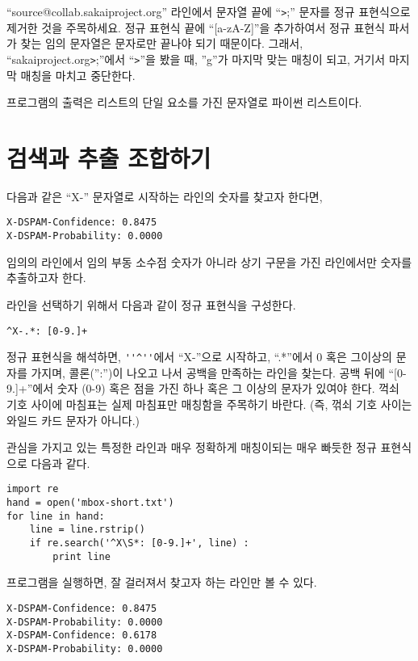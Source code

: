 ``source@collab.sakaiproject.org'' 라인에서 문자열 끝에 ``\verb">";'' 문자를 정규 표현식으로 제거한 것을 주목하세요.
정규 표현식 끝에 ``[a-zA-Z]''을 추가하여서 정규 표현식 파서가 찾는 임의 문자열은 문자로만 끝나야 되기 때문이다.
그래서, ``sakaiproject.org\verb">";''에서 ``\verb">"''을 봤을 때, ''g''가 마지막 맞는 매칭이 되고, 거기서 마지막 매칭을 마치고 중단한다.

프로그램의 출력은 리스트의 단일 요소를 가진 문자열로 파이썬 리스트이다.

\section{검색과 추출 조합하기}

다음과 같은 ``X-'' 문자열로 시작하는 라인의 숫자를 찾고자 한다면,

\beforeverb
\begin{verbatim}
X-DSPAM-Confidence: 0.8475
X-DSPAM-Probability: 0.0000  
\end{verbatim}
\afterverb
%

임의의 라인에서 임의 부동 소수점 숫자가 아니라 상기 구문을 가진 라인에서만 숫자를 추출하고자 한다.

라인을 선택하기 위해서 다음과 같이 정규 표현식을 구성한다.

\beforeverb
\begin{verbatim}
^X-.*: [0-9.]+
\end{verbatim}
\afterverb
%

정규 표현식을 해석하면, {\verb"''^''"}에서 ``X-''으로 시작하고, ``.*''에서 0 혹은 그이상의 문자를 가지며, 콜론('':'')이 나오고 나서 공백을 만족하는 라인을 찾는다.
공백 뒤에 ``[0-9.]+''에서 숫자 (0-9) 혹은 점을 가진 하나 혹은 그 이상의 문자가 있여야 한다.
꺽쇠 기호 사이에 마침표는 실제 마침표만 매칭함을 주목하기 바란다. (즉, 꺾쇠 기호 사이는 와일드 카드 문자가 아니다.)

관심을 가지고 있는 특정한 라인과 매우 정확하게 매칭이되는 매우 빠듯한 정규 표현식으로 다음과 같다.

\beforeverb
\begin{verbatim}
import re
hand = open('mbox-short.txt')
for line in hand:
    line = line.rstrip()
    if re.search('^X\S*: [0-9.]+', line) :
        print line
\end{verbatim}
\afterverb
%

프로그램을 실행하면, 잘 걸러져서 찾고자 하는 라인만 볼 수 있다.

\beforeverb
\begin{verbatim}
X-DSPAM-Confidence: 0.8475
X-DSPAM-Probability: 0.0000
X-DSPAM-Confidence: 0.6178
X-DSPAM-Probability: 0.0000
\end{verbatim}
\afterverb
%

